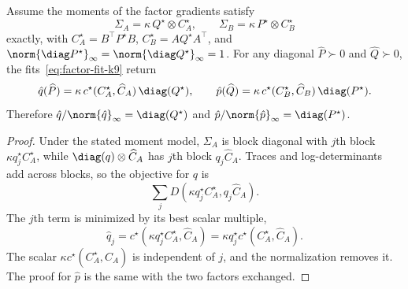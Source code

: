 \begin{lemma}\label{lem:consistency-k9}
Assume the moments of the factor gradients satisfy
\[
  \Sigma_A=\kappa\,Q^\star\otimes C^\star_A,
  \qquad
  \Sigma_B=\kappa\,P^\star\otimes C^\star_B
\]
exactly, with
$C^\star_A=B^\top P^\star B$,
$C^\star_B=AQ^\star A^\top$, and
$\norm{\diag P^\star}_\infty=\norm{\diag Q^\star}_\infty=1$.
For any diagonal $\widehat P\succ0$ and $\widehat Q\succ0$, the
fits~\eqref{eq:factor-fit-k9} return
\[
  \hat{q}(\widehat P)
  =
  \kappa\,c^\star(C^\star_A,\widehat C_A)\,\diag(Q^\star),
  \qquad
  \hat{p}(\widehat Q)
  =
  \kappa\,c^\star(C^\star_B,\widehat C_B)\,\diag(P^\star).
\]
Therefore
$\hat{q}/\norm{\hat{q}}_\infty=\diag(Q^\star)$ and
$\hat{p}/\norm{\hat{p}}_\infty=\diag(P^\star)$.
\end{lemma}
\begin{proof}
Under the stated moment model, $\Sigma_A$ is block diagonal
with $j$th block $\kappa q^\star_j C^\star_A$, while
$\diag(q)\otimes\widehat C_A$ has $j$th block $q_j\widehat C_A$.
Traces and log-determinants add across blocks, so the objective for
$q$ is
\[
  \sum_j D(\kappa q^\star_j C^\star_A, q_j\widehat C_A).
\]
The $j$th term is minimized by its best scalar multiple,
\[
  \hat q_j
  =
  c^\star(\kappa q^\star_j C^\star_A,\widehat C_A)
  =
  \kappa q^\star_j c^\star(C^\star_A,\widehat C_A).
\]
The scalar $\kappa c^\star(C^\star_A,\widehat C_A)$ is independent of
$j$, and the normalization removes it. The proof for $\hat p$ is the
same with the two factors exchanged.
\end{proof}

